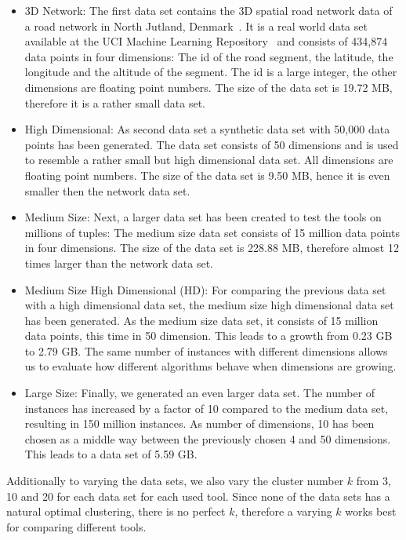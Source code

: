 \begin{itemize} 
\item 3D Network: The first data set contains the 3D spatial road network data of a road network in North Jutland, Denmark~\parencite{3dnet}. It is a real world data set available at the UCI Machine Learning Repository~\parencite{frank2010uci} and consists of 434,874 data points in four dimensions: The id of the road segment, the latitude, the longitude and the altitude of the segment. The id is a large integer, the other dimensions are floating point numbers. The size of the data set is 19.72 MB, therefore it is a rather small data set.

\item High Dimensional: As second data set a synthetic data set with 50,000 data points has been generated. The data set consists of 50 dimensions and is used to resemble a rather small but high dimensional data set. All dimensions are floating point numbers. The size of the data set is 9.50 MB, hence it is even smaller then the network data set.

\item Medium Size: Next, a larger data set has been created to test the tools on millions of tuples: The medium size data set consists of 15 million data points in four dimensions. The size of the data set is 228.88 MB, therefore almost 12 times larger than the network data set.

\item Medium Size High Dimensional (HD): For comparing the previous data set with a high dimensional data set, the medium size high dimensional data set has been generated. As the medium size data set, it consists of 15 million data points, this time in 50 dimension. This leads to a growth from 0.23 GB to 2.79 GB. The same number of instances with different dimensions allows us to evaluate how different algorithms behave when dimensions are growing.

\item Large Size: Finally, we generated an even larger data set. The number of instances has increased by a factor of 10 compared to the medium data set, resulting in 150 million instances. As number of dimensions, 10 has been chosen as a middle way between the previously chosen 4 and 50 dimensions. This leads to a data set of 5.59 GB.
\end{itemize} 

Additionally to varying the data sets, we also vary the cluster number $k$ from 3, 10 and 20 for each data set for each used tool. Since none of the data sets has a natural optimal clustering, there is no perfect $k$, therefore a varying $k$ works best for comparing different tools.


